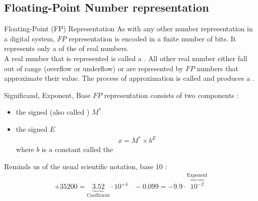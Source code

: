 \subsection{Floating-Point Number representation}
\begin{parag}{Floating-Point (FP) Representation}
    As with any other number representation in a digital system, $FP$ representation is encoded in a finite number of bits. It represents only a  of the  of real numbers.
    \\
    A real number that is  represented is called a . All other real number either fall out of range (overflow or underflow) or are represented by $FP$ numbers that approximate their value. The process of approximation is called  and produces a .
    

\end{parag}

    \begin{parag}{Significand, Exponent, Base}
        $FP$ representation consists of two components : 
        \begin{itemize}
            \item the signed  (also called ) $M^*$
            \item the signed  $E$
                \begin{align*}
                    x = M^* \times b^E
                \end{align*}
                where $b$ is a constant called the 
                
        \end{itemize}
        Reminds us of the usual scientific notation, base $10$ :
        \begin{align*}
            +35200 = \underbrace{3.52}_{ \text{Coefficient}} \cdot 10^{+4} \; \; \; -0.099 = -9.9 \cdot \overbrace{10^{-2}}^{\text{Exponent}} 
        \end{align*}
        
    
    \end{parag}
    
